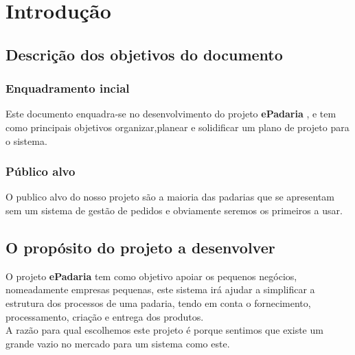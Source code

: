 \chapter{Introdução}
\label{introdução}
\section{Descrição dos objetivos do documento}
\subsection{Enquadramento incial}
Este documento enquadra-se no desenvolvimento do projeto \textbf{ePadaria} , e tem como principais objetivos organizar,planear e solidificar um plano de projeto para o sistema.

\subsection{Público alvo}
O publico alvo do nosso projeto são a maioria das padarias que se apresentam sem um sistema de gestão de pedidos e obviamente seremos os primeiros a usar.

\section{O propósito do projeto a desenvolver}
O projeto \textbf{ePadaria} tem como objetivo apoiar os pequenos negócios, nomeadamente empresas pequenas, este sistema irá ajudar a simplificar a estrutura dos processos de uma padaria, tendo em conta o fornecimento, processamento, criação e entrega dos produtos.
\\
A razão para qual escolhemos este projeto é porque sentimos que existe um grande vazio no mercado para um sistema como este.
